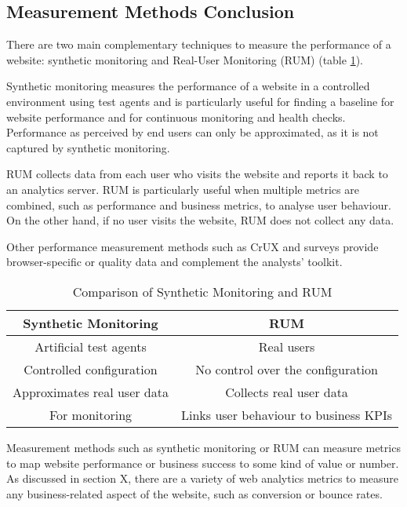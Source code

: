 \subsection{Measurement Methods Conclusion} %

There are two main complementary techniques to measure the performance of a website: synthetic monitoring and Real-User Monitoring (RUM) (table \ref{table:synthetic_monitoring_rum_comparison}).

Synthetic monitoring measures the performance of a website in a controlled environment using test agents and is particularly useful for finding a baseline for website performance and for continuous monitoring and health checks.
Performance as perceived by end users can only be approximated, as it is not captured by synthetic monitoring.

RUM collects data from each user who visits the website and reports it back to an analytics server.
RUM is particularly useful when multiple metrics are combined, such as performance and business metrics, to analyse user behaviour.
On the other hand, if no user visits the website, RUM does not collect any data.

Other performance measurement methods such as CrUX and surveys provide browser-specific or quality data and complement the analysts' toolkit.

\begin{table}[h]
	\small
	\centering
	\begin{tabular}{ | c | c | }
	\hline
	Synthetic Monitoring \cellcolor{lightgrey} & RUM \cellcolor{lightgrey} \\
	\hline
	Artificial test agents & Real users \\
	\hline
	Controlled configuration & No control over the configuration \\
	\hline
	Approximates real user data & Collects real user data \\
	\hline
	For monitoring & Links user behaviour to business KPIs \\
	\hline
	\end{tabular}
	\medskip
	\caption{Comparison of Synthetic Monitoring and RUM}
	\label{table:synthetic_monitoring_rum_comparison}
\end{table}


Measurement methods such as synthetic monitoring or RUM can measure metrics to map website performance or business success to some kind of value or number.
As discussed in section X, there are a variety of web analytics metrics to measure any business-related aspect of the website, such as conversion or bounce rates.

